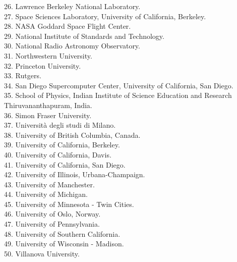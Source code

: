 \documentclass[PICOReport.tex]{subfiles}
\begin{document}
\begin{multicols}{2}
{26. Lawrence Berkeley National Laboratory. \\
27. Space Sciences Laboratory, University of California, Berkeley.  \\
28. NASA Goddard Space Flight Center.  \\
29. National Institute of Standards and Technology.  \\
30. National Radio Astronomy Observatory.  \\
31. Northwestern University.  \\
32. Princeton University.  \\
33. Rutgers.  \\
34. San Diego Supercomputer Center, University of California, San Diego.  \\
35. School of Physics, Indian Institute of Science Education and Research Thiruvananthapuram,  India.  \\
36. Simon Fraser University.  \\
37. Universit\`a degli studi di Milano.  \\
38. University of British Columbia, Canada.  \\
39. University of California, Berkeley.  \\
40. University of California, Davis.  \\
41. University of California, San Diego.  \\
42. University of Illinois, Urbana-Champaign.  \\
43. University of Manchester.  \\
44. University of Michigan.  \\
45. University of Minnesota - Twin Cities.  \\
46. University of Oslo, Norway.  \\
47. University of Pennsylvania.  \\
48. University of Southern California.  \\
49. University of Wisconsin - Madison.  \\
50. Villanova University.  
}
\end{multicols}
\end{document}
